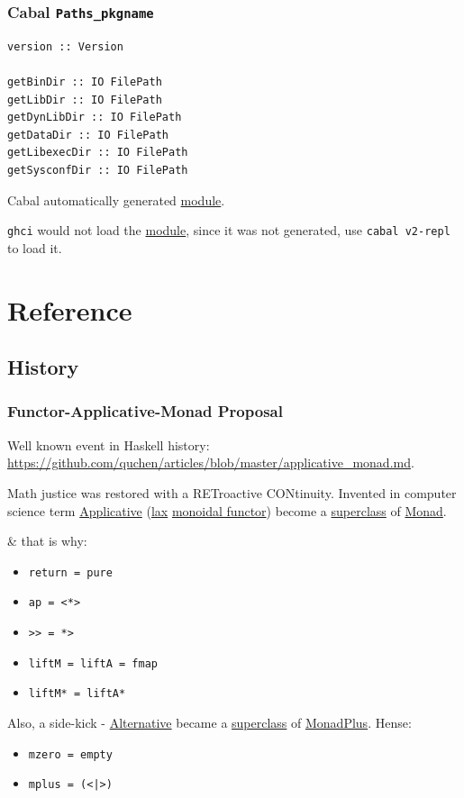 \documentclass[a4paper,14pt,oneside]{book}
\begin{document}
\section{Cabal \texttt{Paths\_pkgname}}
\label{sec:orgaf0685e}

\begin{verbatim}
version :: Version

getBinDir :: IO FilePath
getLibDir :: IO FilePath
getDynLibDir :: IO FilePath
getDataDir :: IO FilePath
getLibexecDir :: IO FilePath
getSysconfDir :: IO FilePath
\end{verbatim}

Cabal automatically generated \hyperref[org69e1bc3]{module}.

\texttt{ghci} would not load the \hyperref[org69e1bc3]{module}, since it was not generated, use \texttt{cabal v2-repl} to load it.

\part{Reference}
\label{sec:orga962003}

\chapter{History}
\label{sec:orgd799ec4}
\section{\label{org64411f7}Functor-Applicative-Monad Proposal}
\label{sec:org1520758}
Well known event in Haskell history: \url{https://github.com/quchen/articles/blob/master/applicative\_monad.md}.

Math justice was restored with a RETroactive CONtinuity. Invented in computer science term \hyperref[orge6acd83]{Applicative} (\hyperref[org8470a3e]{lax} \hyperref[org6eb15e6]{monoidal functor}) become a \hyperref[orgfb50713]{superclass} of \hyperref[org10af2bd]{Monad}.

\& that is why:
\begin{itemize}
\item \texttt{return = pure}
\item \texttt{ap = <*>}
\item \texttt{>> = *>}
\item \texttt{liftM = liftA = fmap}
\item \texttt{liftM* = liftA*}
\end{itemize}

Also, a side-kick - \hyperref[orgfb916b8]{Alternative} became a \hyperref[orgfb50713]{superclass} of \hyperref[orgf3a7d59]{MonadPlus}. Hense:
\begin{itemize}
\item \texttt{mzero = empty}
\item \texttt{mplus = (<|>)}
\end{itemize}
\end{document}
